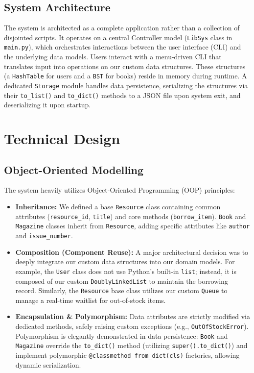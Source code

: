 \documentclass[11pt,a4paper]{article}
\begin{document}
\subsection{System Architecture}
The system is architected as a complete application rather than a collection of disjointed scripts. It operates on a central Controller model (\texttt{LibSys} class in \texttt{main.py}), which orchestrates interactions between the user interface (CLI) and the underlying data models. 
Users interact with a menu-driven CLI that translates input into operations on our custom data structures. These structures (a \texttt{HashTable} for users and a \texttt{BST} for books) reside in memory during runtime. A dedicated \texttt{Storage} module handles data persistence, serializing the structures via their \texttt{to\_list()} and \texttt{to\_dict()} methods to a JSON file upon system exit, and deserializing it upon startup. 

\section{Technical Design}
\label{sec:technical_design}

\subsection{Object-Oriented Modelling}
The system heavily utilizes Object-Oriented Programming (OOP) principles:
\begin{itemize}
    \item \textbf{Inheritance:} We defined a base \texttt{Resource} class containing common attributes (\texttt{resource\_id}, \texttt{title}) and core methods (\texttt{borrow\_item}). \texttt{Book} and \texttt{Magazine} classes inherit from \texttt{Resource}, adding specific attributes like \texttt{author} and \texttt{issue\_number}.
    \item \textbf{Composition (Component Reuse):} A major architectural decision was to deeply integrate our custom data structures into our domain models. For example, the \texttt{User} class does not use Python's built-in \texttt{list}; instead, it is composed of our custom \texttt{DoublyLinkedList} to maintain the borrowing record. Similarly, the \texttt{Resource} base class utilizes our custom \texttt{Queue} to manage a real-time waitlist for out-of-stock items.
    \item \textbf{Encapsulation \& Polymorphism:} Data attributes are strictly modified via dedicated methods, safely raising custom exceptions (e.g., \texttt{OutOfStockError}). Polymorphism is elegantly demonstrated in data persistence: \texttt{Book} and \texttt{Magazine} override the \texttt{to\_dict()} method (utilizing \texttt{super().to\_dict()}) and implement polymorphic \texttt{@classmethod from\_dict(cls)} factories, allowing dynamic serialization.
\end{itemize}
\end{document}
